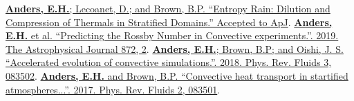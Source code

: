 


\footnotesize
\href{https://ui.adsabs.harvard.edu/abs/2019arXiv190602342A/abstract}{\textbf{Anders, E.H.}; Lecoanet, D.; and Brown, B.P. ``Entropy Rain: Dilution and Compression of Thermals in Stratified Domains.'' Accepted to ApJ}.
\newline
\href{https://iopscience.iop.org/article/10.3847/1538-4357/aaff61}{\textbf{Anders, E.H.} et al. ``Predicting the Rossby Number in Convective experiments.''. 2019. The Astrophysical Journal 872, 2}.
\newline
\href{https://journals.aps.org/prfluids/abstract/10.1103/PhysRevFluids.3.083502}{\textbf{Anders, E.H.}; Brown, B.P; and Oishi, J. S. ``Accelerated evolution of convective simulations.''. 2018.  Phys. Rev. Fluids 3, 083502}.
\newline
\href{https://journals.aps.org/prfluids/abstract/10.1103/PhysRevFluids.2.083501}{\textbf{Anders, E.H.} and Brown, B.P. ``Convective heat transport in startified atmospheres...''. 2017.  Phys. Rev. Fluids 2, 083501}.
\normalsize
\newline\,\newline
